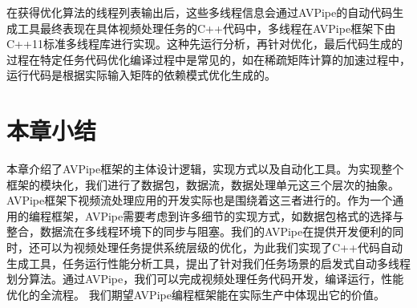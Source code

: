 
在获得优化算法的线程列表输出后，这些多线程信息会通过AVPipe的自动代码生成工具最终表现在具体视频处理任务的C++代码中，多线程在AVPipe框架下由C++11标准多线程库进行实现。这种先运行分析，再针对优化，最后代码生成的过程在特定任务代码优化编译过程中是常见的，如在稀疏矩阵计算的加速过程中，运行代码是根据实际输入矩阵的依赖模式优化生成的\cite{cheshmi2018parsy}。


\section{本章小结}
本章介绍了AVPipe框架的主体设计逻辑，实现方式以及自动化工具。为实现整个框架的模块化，我们进行了数据包，数据流，数据处理单元这三个层次的抽象。AVPipe框架下视频流处理应用的开发实际也是围绕着这三者进行的。作为一个通用的编程框架，AVPipe需要考虑到许多细节的实现方式，如数据包格式的选择与整合，数据流在多线程环境下的同步与阻塞。我们的AVPipe在提供开发便利的同时，还可以为视频处理任务提供系统层级的优化，为此我们实现了C++代码自动生成工具，任务运行性能分析工具，提出了针对我们任务场景的启发式自动多线程划分算法。通过AVPipe，我们可以完成视频处理任务代码开发，编译运行，性能优化的全流程。
我们期望AVPipe编程框架能在实际生产中体现出它的价值。
